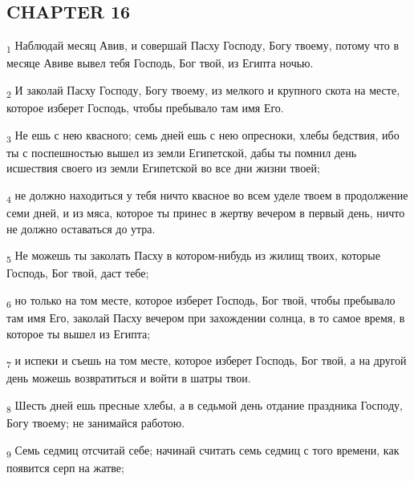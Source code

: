 \subsection{CHAPTER 16}
\begin{tcolorbox}
\textsubscript{1} Наблюдай месяц Авив, и совершай Пасху Господу, Богу твоему, потому что в месяце Авиве вывел тебя Господь, Бог твой, из Египта ночью.
\end{tcolorbox}
\begin{tcolorbox}
\textsubscript{2} И заколай Пасху Господу, Богу твоему, из мелкого и крупного скота на месте, которое изберет Господь, чтобы пребывало там имя Его.
\end{tcolorbox}
\begin{tcolorbox}
\textsubscript{3} Не ешь с нею квасного; семь дней ешь с нею опресноки, хлебы бедствия, ибо ты с поспешностью вышел из земли Египетской, дабы ты помнил день исшествия своего из земли Египетской во все дни жизни твоей;
\end{tcolorbox}
\begin{tcolorbox}
\textsubscript{4} не должно находиться у тебя ничто квасное во всем уделе твоем в продолжение семи дней, и из мяса, которое ты принес в жертву вечером в первый день, ничто не должно оставаться до утра.
\end{tcolorbox}
\begin{tcolorbox}
\textsubscript{5} Не можешь ты заколать Пасху в котором-нибудь из жилищ твоих, которые Господь, Бог твой, даст тебе;
\end{tcolorbox}
\begin{tcolorbox}
\textsubscript{6} но только на том месте, которое изберет Господь, Бог твой, чтобы пребывало там имя Его, заколай Пасху вечером при захождении солнца, в то самое время, в которое ты вышел из Египта;
\end{tcolorbox}
\begin{tcolorbox}
\textsubscript{7} и испеки и съешь на том месте, которое изберет Господь, Бог твой, а на другой день можешь возвратиться и войти в шатры твои.
\end{tcolorbox}
\begin{tcolorbox}
\textsubscript{8} Шесть дней ешь пресные хлебы, а в седьмой день отдание праздника Господу, Богу твоему; не занимайся работою.
\end{tcolorbox}
\begin{tcolorbox}
\textsubscript{9} Семь седмиц отсчитай себе; начинай считать семь седмиц с того времени, как появится серп на жатве;
\end{tcolorbox}
